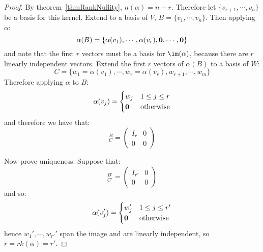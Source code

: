 \documentclass[../Main.tex]{subfiles}
\begin{document}
\begin{proof}
    By theorem~\ref{thmRankNullity}, $n(\alpha) = n-r$. Therefore let $\{v_{r+1}, \cdots, v_n\}$ be a basis for this kernel. Extend to a basis of $V$, $B = \{v_1, \cdots, v_n\}$. Then applying $\alpha$:
    \begin{equation*}
        \alpha(B) = \{\alpha(v_1), \cdots, \alpha(v_r), \boldsymbol{0}, \cdots, \boldsymbol{0}\}
    \end{equation*}
    and note that the first $r$ vectors must be a basis for $\im(\alpha)$, because there are $r$ linearly independent vectors. Extend the first $r$ vectors of $\alpha(B)$ to a basis of $W$:
    \begin{equation*}
        C = \{w_1 = \alpha(v_1), \cdots, w_r = \alpha(v_r), w_{r+1}, \cdots, w_m\}
    \end{equation*}
    Therefore applying $\alpha$ to $B$:
    \begin{equation*}
        \alpha(v_j) =
        \begin{cases}
            w_j & 1 \leq j \leq r \\
            \boldsymbol{0} & \text{otherwise}
        \end{cases}
    \end{equation*}
    and therefore we have that:
    \begin{equation*}
        [\alpha]_C^B =
        \begin{pmatrix}
            I_r & 0 \\
            0 & 0
        \end{pmatrix}
    \end{equation*}

    Now prove uniqueness. Suppose that:
    \begin{equation*}
        [\alpha]_{C'}^{B'} =
        \begin{pmatrix}
            I_{r'} & 0 \\
            0 & 0
        \end{pmatrix}
    \end{equation*}
    and so:
    \begin{equation*}
        \alpha(v_j') =
        \begin{cases}
            w_j' & 1 \leq j \leq r' \\
            \boldsymbol{0} & \text{otherwise}
        \end{cases}
    \end{equation*}
    hence $w_1', \cdots, w_{r'}'$ span the image and are linearly independent, so $r = rk(\alpha) = r'$.
\end{proof}
\end{document}

